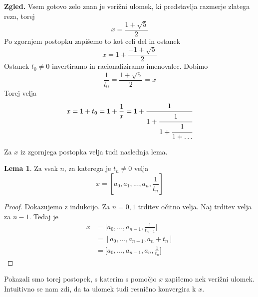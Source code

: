 \documentclass[a4paper,12pt]{article}
\theoremstyle{definition}
\theoremstyle{proposition}
\theoremstyle{theorem}
\theoremstyle{lemma}
\newtheorem{lem}{Lema}[section]
\begin{document}
\textbf{Zgled.} Vsem gotovo zelo znan je verižni ulomek, ki predstavlja razmerje zlatega reza, torej \[x = \frac{1+\sqrt{5}}{2} \] Po zgornjem postopku zapišemo to kot celi del in ostanek \[x = 1 +\frac{-1+\sqrt{5}}{2} \] Ostanek $t_0 \neq 0$ invertiramo in racionaliziramo imenovalec. Dobimo \[\frac{1}{t_0} =\frac{1+\sqrt{5}}{2} = x \] Torej velja \[x = 1 + t_0 = 1 + \frac{1}{x} = 1 + \cfrac{1}{1+\cfrac{1}{1+\cfrac{1}{1+\ldots}}}\]

Za $x$ iz zgornjega postopka velja tudi naslednja lema.

\begin{lem}
\label{lema}
Za vsak $n$, za katerega je $t_n \neq 0$ velja
\[ x=[a_0, a_1, ..., a_n, \frac{1}{t_n}] \]
\end{lem}
\begin{proof}
Dokazujemo z indukcijo. Za $n=0,1$ trditev očitno velja. Naj trditev velja za $n-1$. Tedaj je
\begin{equation}
\begin{split}
x &= \big[a_0,...,a_{n-1},\frac{1}{t_{n-1}}\big] \\
&= [a_0,...,a_{n-1}, a_n + t_n] \\
&= \big[a_0, ...,a_{n-1}, a_n, \frac{1}{t_n}\big]
\end{split}
\end{equation}
\end{proof}

Pokazali smo torej postopek, s katerim s pomočjo $x$ zapišemo nek verižni ulomek. Intuitivno se nam zdi, da ta ulomek tudi resnično konvergira k $x$.
\end{document}
